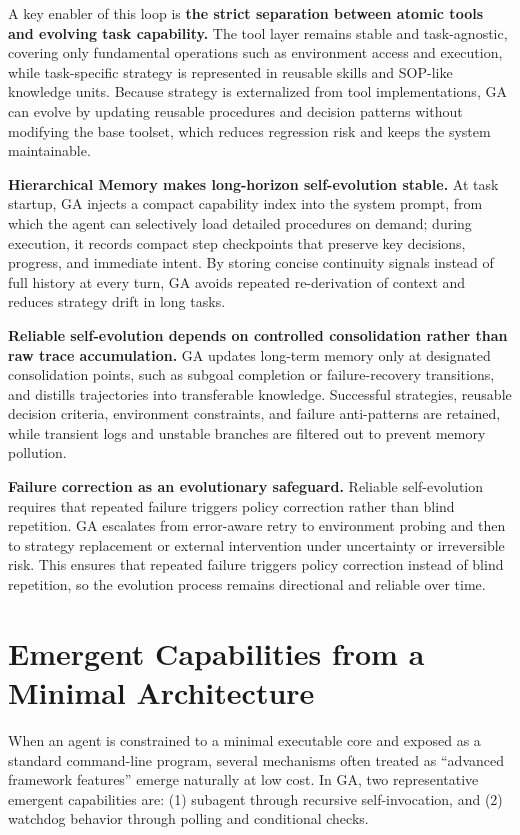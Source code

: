 A key enabler of this loop is \textbf{the strict separation between atomic tools and evolving task capability.} The tool layer remains stable and task-agnostic, covering only fundamental operations such as environment access and execution, while task-specific strategy is represented in reusable skills and SOP-like knowledge units. Because strategy is externalized from tool implementations, GA can evolve by updating reusable procedures and decision patterns without modifying the base toolset, which reduces regression risk and keeps the system maintainable.

\textbf{Hierarchical Memory makes long-horizon self-evolution stable.} At task startup, GA injects a compact capability index into the system prompt, from which the agent can selectively load detailed procedures on demand; during execution, it records compact step checkpoints that preserve key decisions, progress, and immediate intent. By storing concise continuity signals instead of full history at every turn, GA avoids repeated re-derivation of context and reduces strategy drift in long tasks.

\textbf{Reliable self-evolution depends on controlled consolidation rather than raw trace accumulation.} GA updates long-term memory only at designated consolidation points, such as subgoal completion or failure-recovery transitions, and distills trajectories into transferable knowledge. Successful strategies, reusable decision criteria, environment constraints, and failure anti-patterns are retained, while transient logs and unstable branches are filtered out to prevent memory pollution.

\textbf{Failure correction as an evolutionary safeguard.} 
Reliable self-evolution requires that repeated failure triggers policy correction rather than blind repetition. GA escalates from error-aware retry to environment probing and then to strategy replacement or external intervention under uncertainty or irreversible risk. This ensures that repeated failure triggers policy correction instead of blind repetition, so the evolution process remains directional and reliable over time.

\section{Emergent Capabilities from a Minimal Architecture}
When an agent is constrained to a minimal executable core and exposed as a standard command-line program, several mechanisms often treated as “advanced framework features” emerge naturally at low cost. In GA, two representative emergent capabilities are: (1) subagent through recursive self-invocation, and (2) watchdog behavior through polling and conditional checks.


